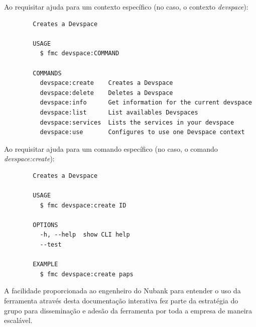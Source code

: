         Ao requisitar ajuda para um contexto específico (no caso, o contexto \textit{devspace}):
        \begin{verbatim}
        Creates a Devspace
        
        USAGE
          $ fmc devspace:COMMAND
        
        COMMANDS
          devspace:create    Creates a Devspace
          devspace:delete    Deletes a Devspace
          devspace:info      Get information for the current devspace
          devspace:list      List availables Devspaces
          devspace:services  Lists the services in your devspace
          devspace:use       Configures to use one Devspace context
        \end{verbatim}
        
        
        Ao requisitar ajuda para um comando específico (no caso, o comando \textit{devspace:create}):
        \begin{verbatim}
        Creates a Devspace
        
        USAGE
          $ fmc devspace:create ID
        
        OPTIONS
          -h, --help  show CLI help
          --test
        
        EXAMPLE
          $ fmc devspace:create paps
        \end{verbatim}
    
    
        A facilidade proporcionada ao engenheiro do Nubank para entender o uso da ferramenta através desta documentação interativa fez parte da estratégia do grupo para disseminação e adesão da ferramenta por toda a empresa de maneira escalável.
    
    
        
